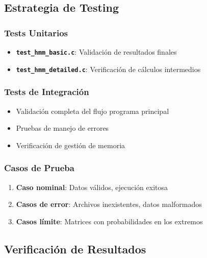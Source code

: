 \documentclass[
]{article}
\providecommand{\tightlist}{%
  \setlength{\itemsep}{0pt}\setlength{\parskip}{0pt}}
\begin{document}
\subsection{Estrategia de Testing}\label{estrategia-de-testing}

\subsubsection{Tests Unitarios}\label{tests-unitarios}

\begin{itemize}
\tightlist
\item
  \textbf{\texttt{test\_hmm\_basic.c}}: Validación de resultados finales
\item
  \textbf{\texttt{test\_hmm\_detailed.c}}: Verificación de cálculos
  intermedios
\end{itemize}

\subsubsection{Tests de Integración}\label{tests-de-integraciuxf3n}

\begin{itemize}
\tightlist
\item
  Validación completa del flujo programa principal
\item
  Pruebas de manejo de errores
\item
  Verificación de gestión de memoria
\end{itemize}

\subsubsection{Casos de Prueba}\label{casos-de-prueba}

\begin{enumerate}
\def\labelenumi{\arabic{enumi}.}
\tightlist
\item
  \textbf{Caso nominal}: Datos válidos, ejecución exitosa
\item
  \textbf{Casos de error}: Archivos inexistentes, datos malformados
\item
  \textbf{Casos límite}: Matrices con probabilidades en los extremos
\end{enumerate}

\subsection{Verificación de
Resultados}\label{verificaciuxf3n-de-resultados}
\end{document}
